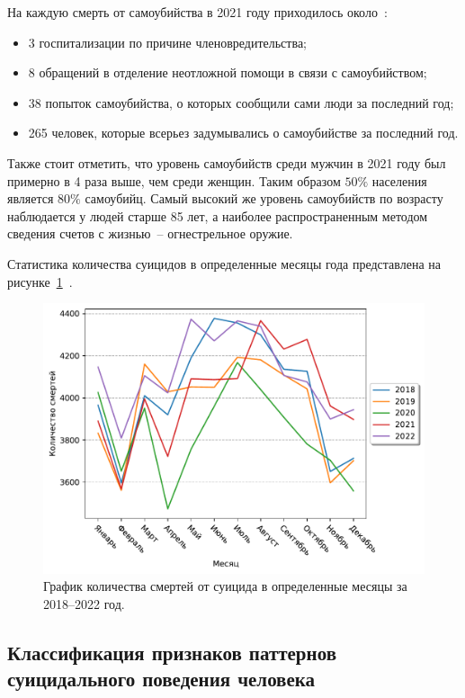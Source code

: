 На каждую смерть от самоубийства в 2021 году приходилось около~\cite{suicideStats}:
\begin{itemize}
	\item 3 госпитализации по причине членовредительства;
	\item 8 обращений в отделение неотложной помощи в связи с самоубийством;
	\item 38 попыток самоубийства, о которых сообщили сами люди за последний год;
	\item 265 человек, которые всерьез задумывались о самоубийстве за последний год. 
\end{itemize}

Также стоит отметить, что уровень самоубийств среди мужчин в 2021 году был примерно в 4 раза выше, чем среди женщин. Таким образом $50\%$ населения является $80\%$ самоубийц. Самый высокий же уровень самоубийств по возрасту наблюдается у людей старше 85 лет, а наиболее распространенным методом сведения счетов с жизнью~-- огнестрельное оружие.

Статистика количества суицидов в определенные месяцы года представлена на рисунке~\ref{img:cdcsuicides}~\cite{suicideStats}.

\begin{figure}[H]
	\centering
	\includegraphics[width=\textwidth]{inc/deathToMonth.pdf}
	\caption{ График количества смертей от суицида в определенные месяцы за 2018--2022 год. }\label{img:cdcsuicides}
\end{figure}


\subsection{Классификация признаков паттернов суицидального поведения человека}

